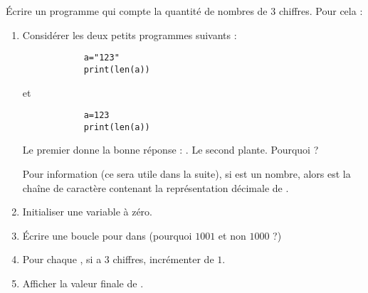 
\begin{exercice}\label{exoSeconde-0086}

    Écrire un programme qui compte la quantité de nombres de \( 3\) chiffres. Pour cela :
    \begin{multicols}{2}
    \begin{enumerate}
        \item
            Considérer les deux petits programmes suivants :
            \begin{verbatim}
            a="123"
            print(len(a))
            \end{verbatim}
            et
            \begin{verbatim}
            a=123
            print(len(a))
            \end{verbatim}
            Le premier donne la bonne réponse : . Le second plante. Pourquoi ?

            Pour information (ce sera utile dans la suite), si  est un nombre, alors  est la chaîne de caractère contenant la représentation décimale de .
        \item
            Initialiser une variable  à zéro.
        \item
            Écrire une boucle pour  dans  (pourquoi \( 1001\) et non \( 1000\) ?)
        \item
            Pour chaque , si  a \( 3\) chiffres, incrémenter  de \( 1\).
        \item
            Afficher la valeur finale de .
    \end{enumerate}
    \end{multicols}

\end{exercice}
